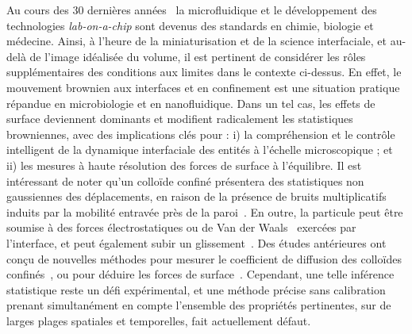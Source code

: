 Au cours des 30 dernières années~\cite{whitesides_origins_2006, convery_30_2019} la microfluidique et le développement des technologies \textit{lab-on-a-chip} \cite{neuzil_revisiting_2012,ding_surface_2013} sont devenus des standards en chimie, biologie et médecine. Ainsi, à l'heure de la miniaturisation et de la science interfaciale, et au-delà de l'image idéalisée du volume, il est pertinent de considérer les rôles supplémentaires des conditions aux limites dans le contexte ci-dessus. En effet, le mouvement brownien aux interfaces et en confinement est une situation pratique répandue en microbiologie et en nanofluidique. Dans un tel cas, les effets de surface deviennent dominants et modifient radicalement les statistiques browniennes, avec des implications clés pour : i) la compréhension et le contrôle intelligent de la dynamique interfaciale des entités à l'échelle microscopique ; et ii) les mesures à haute résolution des forces de surface à l'équilibre. Il est intéressant de noter qu'un colloïde confiné présentera des statistiques non gaussiennes des déplacements, en raison de la présence de bruits multiplicatifs induits par la mobilité entravée près de la paroi~\cite{felderhof_effect_2005,wang_anomalous_2009,chechkin_brownian_2017}. En outre, la particule peut être soumise à des forces électrostatiques ou de Van der Waals~\cite{bouzigues_nanofluidics_2008} exercées par l'interface, et peut également subir un glissement~\cite{joly_probing_2006,mo_brownian_2017}. Des études antérieures ont conçu de nouvelles méthodes pour mesurer le coefficient de diffusion des colloïdes confinés~\cite{faucheux_confined_1994,dufresne_brownian_2001,carbajal-tinoco_asymmetry_2007,eral_anisotropic_2010,sharma_high-precision_2010, mo_broadband_2015,matse_test_2017}, ou pour déduire les forces de surface~\cite{prieve_measurement_1999,banerjee_experimental_2005,sainis_statistics_2007,volpe_influence_2010,wang_measurement_2011,li_subfemtonewton_2019}. Cependant, une telle inférence statistique reste un défi expérimental, et une méthode précise sans calibration prenant simultanément en compte l'ensemble des propriétés pertinentes, sur de larges plages spatiales et temporelles, fait actuellement défaut.

